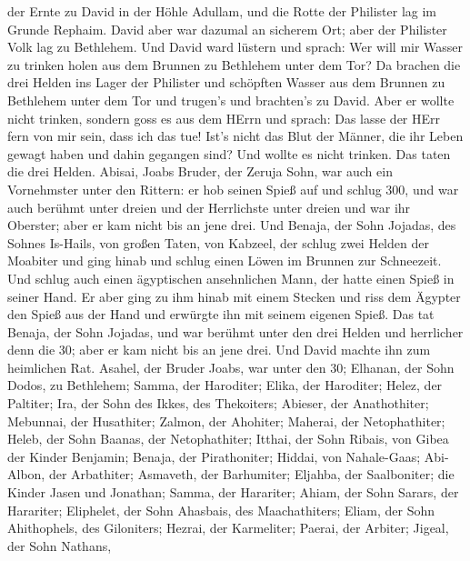 der Ernte zu David in der Höhle Adullam, und die Rotte der Philister lag
im Grunde Rephaim.  David aber war dazumal an sicherem Ort;
aber der Philister Volk lag zu Bethlehem.  Und David ward
lüstern und sprach: Wer will mir Wasser zu trinken holen aus dem Brunnen
zu Bethlehem unter dem Tor?  Da brachen die drei Helden ins
Lager der Philister und schöpften Wasser aus dem Brunnen zu Bethlehem
unter dem Tor und trugen's und brachten's zu David. Aber er wollte nicht
trinken, sondern goss es aus dem HErrn  und sprach: Das
lasse der HErr fern von mir sein, dass ich das tue! Ist's nicht das Blut
der Männer, die ihr Leben gewagt haben und dahin gegangen sind? Und
wollte es nicht trinken. Das taten die drei Helden. 
Abisai, Joabs Bruder, der Zeruja Sohn, war auch ein Vornehmster unter
den Rittern: er hob seinen Spieß auf und schlug 300, und war auch
berühmt unter dreien  und der Herrlichste unter dreien und
war ihr Oberster; aber er kam nicht bis an jene drei.  Und
Benaja, der Sohn Jojadas, des Sohnes Is-Hails, von großen Taten, von
Kabzeel, der schlug zwei Helden der Moabiter und ging hinab und schlug
einen Löwen im Brunnen zur Schneezeit.  Und schlug auch
einen ägyptischen ansehnlichen Mann, der hatte einen Spieß in seiner
Hand. Er aber ging zu ihm hinab mit einem Stecken und riss dem Ägypter
den Spieß aus der Hand und erwürgte ihn mit seinem eigenen Spieß.
 Das tat Benaja, der Sohn Jojadas, und war berühmt unter
den drei Helden  und herrlicher denn die 30; aber er kam
nicht bis an jene drei. Und David machte ihn zum heimlichen Rat.
 Asahel, der Bruder Joabs, war unter den 30; Elhanan, der
Sohn Dodos, zu Bethlehem;  Samma, der Haroditer; Elika, der
Haroditer;  Helez, der Paltiter; Ira, der Sohn des Ikkes,
des Thekoiters;  Abieser, der Anathothiter; Mebunnai, der
Husathiter;  Zalmon, der Ahohiter; Maherai, der
Netophathiter;  Heleb, der Sohn Baanas, der Netophathiter;
Itthai, der Sohn Ribais, von Gibea der Kinder Benjamin; 
Benaja, der Pirathoniter; Hiddai, von Nahale-Gaas; 
Abi-Albon, der Arbathiter; Asmaveth, der Barhumiter; 
Eljahba, der Saalboniter; die Kinder Jasen und Jonathan; 
Samma, der Harariter; Ahiam, der Sohn Sarars, der Harariter;
 Eliphelet, der Sohn Ahasbais, des Maachathiters; Eliam,
der Sohn Ahithophels, des Giloniters;  Hezrai, der
Karmeliter; Paerai, der Arbiter;  Jigeal, der Sohn Nathans,
